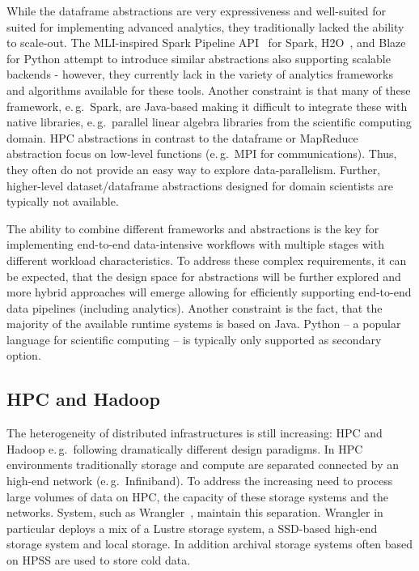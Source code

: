 \documentclass{sig-alternate}
\begin{document}
While the dataframe abstractions are very expressiveness and well-suited for
suited for implementing advanced analytics, they traditionally lacked the
ability to scale-out. The MLI-inspired Spark Pipeline API~\cite{mli} for Spark,
H2O~\cite{h2o}, and Blaze~\cite{blaze} for Python attempt to introduce similar
abstractions also supporting scalable backends - however, they currently lack
in the variety of analytics frameworks and algorithms available for these
tools. Another constraint is that many of these framework, e.\,g.\ Spark, are
Java-based making it difficult to integrate these with native libraries,
e.\,g.\ parallel linear algebra libraries from the scientific computing domain.
HPC abstractions in contrast to the dataframe or MapReduce abstraction focus on
low-level functions (e.\,g.\ MPI for communications). Thus, they often do not
provide an easy way to explore data-parallelism. Further, higher-level
dataset/dataframe abstractions designed for domain scientists are typically not
available.


The ability to combine different frameworks and abstractions is the key for
implementing end-to-end data-intensive workflows with multiple stages with
different workload characteristics. To address these complex requirements, it
can be expected, that the design space for abstractions will be further
explored and more hybrid approaches will emerge allowing for efficiently
supporting end-to-end data pipelines (including analytics). Another constraint
is the fact, that the majority of the available runtime systems is based on
Java. Python -- a popular language for scientific computing -- is
typically only supported as secondary option.






\subsection{HPC and Hadoop}


The heterogeneity of distributed infrastructures is still increasing: HPC and
Hadoop e.\,g.\ following dramatically different design paradigms. In HPC
environments traditionally storage and compute are separated connected by an
high-end network (e.\,g.\ Infiniband). To address the increasing need to
process large volumes of data on HPC, the capacity of these storage systems and
the networks. System, such as Wrangler~\cite{wrangler}, maintain this
separation. Wrangler in particular deploys a mix of a Lustre storage system, a
SSD-based high-end storage system and local storage. In addition archival
storage systems often based on HPSS are used to store cold data.
\end{document}
